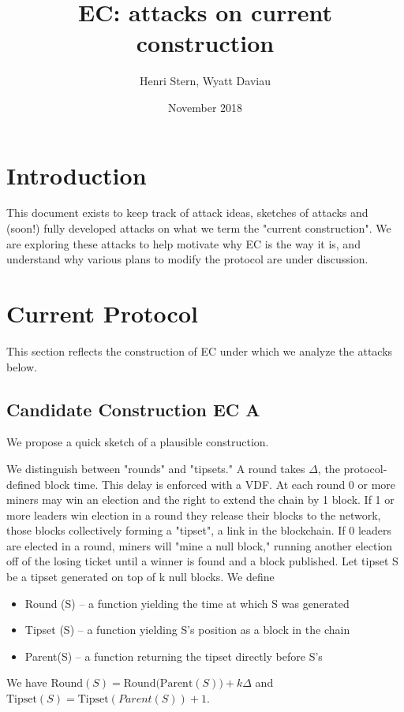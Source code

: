\documentclass{article}
\title{EC: attacks on current construction}
\author{Henri Stern, Wyatt Daviau}
\date{November 2018}
\newcommand{\ec}{EC A}
\begin{document}
\maketitle

\section{Introduction}
This document exists to keep track of attack ideas, sketches of attacks and (soon!) fully developed attacks on what we term the "current construction".  We are exploring these attacks to help motivate why EC is the way it is, and understand why various plans to modify the protocol are under discussion.

\section{Current Protocol}

This section reflects the construction of EC under which we analyze the attacks below.

\subsection{Candidate Construction \ec{}}
We propose a quick sketch of a plausible construction.

We distinguish between "rounds" and "tipsets." A round takes $\Delta$, the protocol-defined block time. This delay is enforced with a VDF.  At each round 0 or more miners may win an election and the right to extend the chain by 1 block. If 1 or more leaders win election in a round they release their blocks to the network, those blocks collectively forming a "tipset", a link in the blockchain.  If 0 leaders are elected in a round, miners will "mine a null block," running another election off of the losing ticket until a winner is found and a block published. Let tipset S be a tipset generated on top of k null blocks. We define
\begin{itemize}
\item Round (S) -- a function yielding the time at which S was generated
\item Tipset (S) -- a function yielding S's position as a block in the chain
\item Parent(S) -- a function returning the tipset directly before S's
\end{itemize}
We have $\text{Round}(S) = \text{Round(Parent}(S)) + k\Delta$ and $\text{Tipset}(S) = \text{Tipset}(Parent(S)) + 1$.
\end{document}
